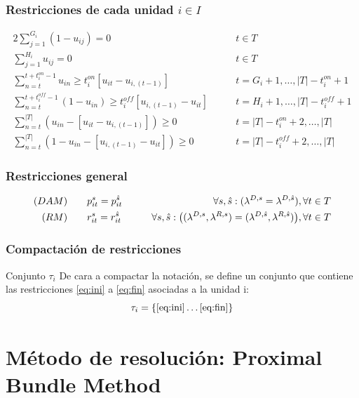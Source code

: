 \documentclass[xcolor=dvipsnames, utf8, spanish]{beamer} %
\begin{document}
\begin{frame}
	\frametitle{Restricciones de cada unidad $i \in I$}
	\scriptsize
	\begin{alignat}{2}
		\sum_{j=1}^{G_i} (1-u_{ij}) = 0									&\qquad t \in T	\\
		\sum_{j=1}^{H_i} u_{ij} = 0									&\qquad t \in T	\\
		\sum_{n=t}^{t+t_i^{on}-1} u_{in} \geq t_i^{on} [u_{it}-u_{i,(t-1)}]					&\qquad t=G_i+1,\ldots,|T|-t_i^{on}+1 \\
		\sum_{n=t}^{t+t_i^{off}-1} (1-u_{in}) \geq t_i^{off} [u_{i,(t-1)}-u_{it}]					&\qquad t=H_i+1,\ldots,|T|-t_i^{off}+1 \\
		\sum_{n=t}^{|T|} (u_{in}-[u_{it}-u_{i,(t-1)}]) \geq 0 						&\qquad t=|T|-t_i^{on}+2,\ldots,|T| \\
		\sum_{n=t}^{|T|} (1-u_{in}-[u_{i,(t-1)}-u_{it}]) \geq 0 						&\qquad t=|T|-t_i^{off}+2,\ldots,|T|
	\end{alignat}
\end{frame}

\begin{frame}
	\frametitle{Restricciones general}
	\begin{alignat}{3}
		\text(DAM) &\qquad p^{s}_{it} =  p^{\hat{s}}_{it}						&\qquad \forall s, \hat{s}:(\lambda^{D,s}=\lambda^{D,\hat{s}}), \forall t\in T \\
		\text(RM) &\qquad r^{s}_{it} =  r^{\hat{s}}_{it}						&\qquad \forall s, \hat{s}: \big( (\lambda^{D,s},\lambda^{R,s}) = (\lambda^{D,\hat{s}},\lambda^{R,\hat{s}})  \big), \forall t\in T \label{eq:fin}
	\end{alignat}
\end{frame}

\begin{frame}
	\frametitle{Compactación de restricciones}
	\begin{exampleblock} {Conjunto $\tau_i$}
		De cara a compactar la notación, se define un conjunto que contiene las restricciones \eqref{eq:ini} a \eqref{eq:fin} asociadas a la unidad i:
		\begin{equation}
			\tau_i = \{\eqref{eq:ini} \ldots \eqref{eq:fin} \}
		\end{equation}
	\end{exampleblock}
\end{frame}



\section{Método de resolución: Proximal Bundle Method}
\end{document}

